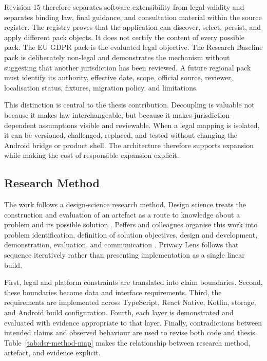 Revision 15 therefore separates software extensibility from legal validity and separates binding law, final guidance, and consultation material within the source register. The registry proves that the application can discover, select, persist, and apply different pack objects. It does not certify the content of every possible pack. The EU GDPR pack is the evaluated legal objective. The Research Baseline pack is deliberately non-legal and demonstrates the mechanism without suggesting that another jurisdiction has been reviewed. A future regional pack must identify its authority, effective date, scope, official source, reviewer, localisation status, fixtures, migration policy, and limitations.

This distinction is central to the thesis contribution. Decoupling is valuable not because it makes law interchangeable, but because it makes jurisdiction-dependent assumptions visible and reviewable. When a legal mapping is isolated, it can be versioned, challenged, replaced, and tested without changing the Android bridge or product shell. The architecture therefore supports expansion while making the cost of responsible expansion explicit.

\subsection{Research Method}

The work follows a design-science research method. Design science treats the construction and evaluation of an artefact as a route to knowledge about a problem and its possible solution \cite{hevner2004}. Peffers and colleagues organise this work into problem identification, definition of solution objectives, design and development, demonstration, evaluation, and communication \cite{peffers2007}. Privacy Lens follows that sequence iteratively rather than presenting implementation as a single linear build.

First, legal and platform constraints are translated into claim boundaries. Second, these boundaries become data and interface requirements. Third, the requirements are implemented across TypeScript, React Native, Kotlin, storage, and Android build configuration. Fourth, each layer is demonstrated and evaluated with evidence appropriate to that layer. Finally, contradictions between intended claims and observed behaviour are used to revise both code and thesis. Table~\ref{tab:dsr-method-map} makes the relationship between research method, artefact, and evidence explicit.

